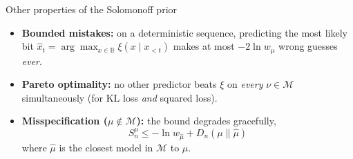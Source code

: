 \documentclass[10pt]{beamer}
\newcommand{\cM}{\mathcal{M}}
\newcommand{\B}{\mathbb{B}}
\begin{document}
\begin{frame}{Other properties of the Solomonoff prior}
\begin{itemize}
    \item \textbf{Bounded mistakes:} on a deterministic sequence, predicting the
    most likely bit $\hat{x}_t = \arg\max_{x \in \B} \xi(x \mid x_{<t})$ makes at most $-2\ln w_\mu$ wrong guesses \emph{ever}.
    \pause
    \item \textbf{Pareto optimality:} no other predictor beats $\xi$ on \emph{every} $\nu\in\cM$
    simultaneously (for KL loss \emph{and} squared loss).
    \pause
    \item \textbf{Misspecification ($\mu \notin \cM$):} the bound degrades gracefully,
    \[
    S^\mu_n \leq -\ln w_{\hat\mu} +  D_n(\mu \parallel \hat\mu)  
    \]
    where $\hat\mu$ is the closest model in $\cM$ to $\mu$.
\end{itemize}
\end{frame}
\end{document}

